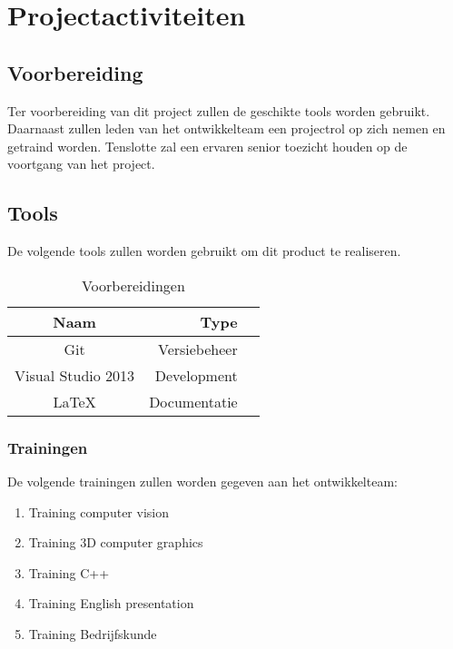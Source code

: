 \chapter{Projectactiviteiten} \label{cha:projectactiviteiten}



\section{Voorbereiding} \label{sec:voorbereiding}
Ter voorbereiding van dit project zullen de geschikte tools worden gebruikt. Daarnaast zullen leden van het ontwikkelteam een projectrol op zich nemen en getraind worden. Tenslotte zal een ervaren senior toezicht houden op de voortgang van het project.
\\
\section{Tools} \label{sec:tools}
De volgende tools zullen worden gebruikt om dit product te realiseren.
\begin{table}[h]
  \centering
  \caption{Voorbereidingen}
  \label{tb:table}
  \begin{tabular}{crl}
    \toprule
    Naam     & Type\\
    \midrule
    Git     & Versiebeheer\\
    Visual Studio 2013  & Development\\
    LaTeX & Documentatie\\    
    \bottomrule
  \end{tabular}
\end{table}
\subsection{Trainingen} \label{subsec:trainingen}
De volgende trainingen zullen worden gegeven aan het ontwikkelteam:
\begin{enumerate}
  \item Training computer vision
  \item Training 3D computer graphics
  \item Training C++
  \item Training English presentation
  \item Training Bedrijfskunde
\end{enumerate}

